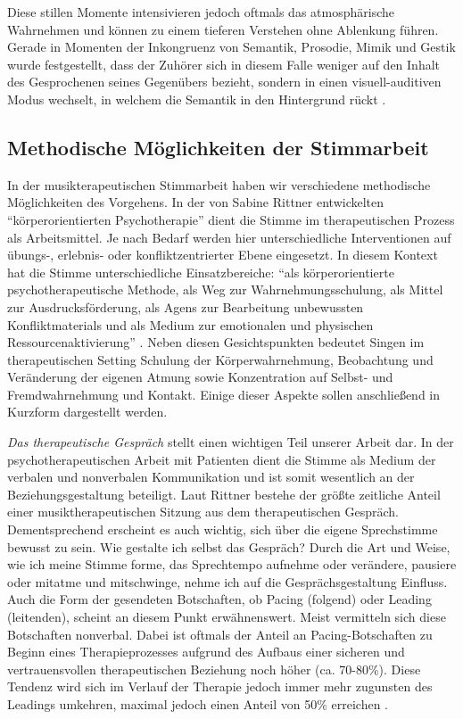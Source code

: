Diese stillen Momente intensivieren jedoch oftmals das atmosphärische Wahrnehmen und können zu einem tieferen Verstehen ohne Ablenkung führen. 
Gerade in Momenten der Inkongruenz von Semantik, Prosodie, Mimik und Gestik wurde festgestellt, dass der Zuhörer sich in diesem Falle weniger auf den Inhalt des Gesprochenen seines Gegenübers bezieht, sondern in einen visuell-auditiven Modus wechselt, in welchem die Semantik in den Hintergrund rückt \autocite [vgl.][206f.]{rittner2008}.

\subsection{Methodische Möglichkeiten der Stimmarbeit}
\label{methodische_moeglichkeiten_der_stimmarbeit}

In der musikterapeutischen Stimmarbeit haben wir verschiedene methodische Möglichkeiten des Vorgehens. In der von Sabine Rittner entwickelten "`körperorientierten Psychotherapie"' dient die Stimme im therapeutischen Prozess als Arbeitsmittel. Je nach Bedarf werden hier unterschiedliche Interventionen auf übungs-, erlebnis- oder konfliktzentrierter Ebene eingesetzt. In diesem Kontext hat die Stimme unterschiedliche Einsatzbereiche: "`als körperorientierte psychotherapeutische Methode, als Weg zur Wahrnehmungsschulung, als Mittel zur Ausdrucksförderung, als Agens zur Bearbeitung unbewussten Konfliktmaterials und als Medium zur emotionalen und physischen Ressourcenaktivierung"' \autocite[58]{rittner2012}. Neben diesen Gesichtspunkten bedeutet Singen im therapeutischen Setting Schulung der Körperwahrnehmung, Beobachtung und Veränderung der eigenen Atmung sowie Konzentration auf Selbst- und Fremdwahrnehmung und Kontakt.
Einige dieser Aspekte sollen anschließend in Kurzform dargestellt werden.

\emph{Das therapeutische Gespräch} stellt einen wichtigen Teil unserer Arbeit dar. In der psychotherapeutischen Arbeit mit Patienten dient die Stimme als Medium der verbalen und nonverbalen Kommunikation und ist somit wesentlich an der Beziehungsgestaltung beteiligt. Laut Rittner bestehe der größte zeitliche Anteil einer musiktherapeutischen Sitzung aus dem therapeutischen Gespräch. Dementsprechend erscheint es auch wichtig, sich über die eigene Sprechstimme bewusst zu sein. Wie gestalte ich selbst das Gespräch? Durch die Art und Weise, wie ich meine Stimme forme, das Sprechtempo aufnehme oder verändere, pausiere oder mitatme und mitschwinge, nehme ich auf die Gesprächsgestaltung Einfluss. Auch die Form der gesendeten Botschaften, ob Pacing (folgend) oder Leading (leitenden), scheint an diesem Punkt erwähnenswert. Meist vermitteln sich diese Botschaften nonverbal. Dabei ist oftmals der Anteil an Pacing-Botschaften zu Beginn eines Therapieprozesses aufgrund des Aufbaus einer sicheren und vertrauensvollen therapeutischen Beziehung noch höher (ca. 70-80\%). Diese Tendenz wird sich im Verlauf der Therapie jedoch immer mehr zugunsten des Leadings umkehren, maximal jedoch einen Anteil von 50\% erreichen \autocite[vgl.][208]{rittner2008}.

